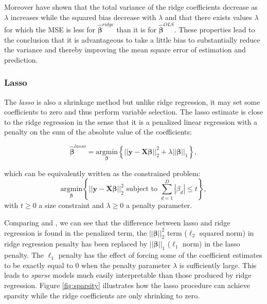 \documentclass[]{book}
\begin{document}
Moreover \citep{hoerl1970ridge} have shown that the total variance of the
ridge coefficients decrease as \(\lambda\) increases while the squared
bias decrease with \(\lambda\) and that there exists values \(\lambda\) for
which the MSE is less for \(\hat{\boldsymbol{\beta}}^{ridge}\) than it is for
\(\hat{\boldsymbol{\beta}}^{OLS}\). These properties lead to the conclusion that it is
advantageous to take a little bias to substantially reduce the variance
and thereby improving the mean square error of estimation and
prediction.

\hypertarget{lasso}{%
\subsubsection*{Lasso}\label{lasso}}

The \emph{lasso} \citep{tibshirani_regression_1996} is also a shrinkage method but
unlike ridge regression, it may set some coefficients to zero and thus
perform variable selection. The lasso estimate is close to the ridge
regression in the sense that it is a penalized linear regression with a
penalty on the sum of the absolute value of the coefficients:

\[\hat{\boldsymbol{\beta}}^{lasso} = \underset{\boldsymbol{\beta}}{\text{argmin}} \left\lbrace || \mathbf{y} - \mathbf{X}\boldsymbol{\beta} ||_2^2 + \lambda ||\boldsymbol{\beta}||_1 \right\rbrace, 
\label{eq:lasso}\]

which can be equivalently written as the constrained problem:
\[\underset{\boldsymbol{\beta}}{\text{argmin}} \left\lbrace || \mathbf{y} - \mathbf{X}\boldsymbol{\beta} ||_2^2 \text{ subject to } \sum_{d=1}^D |\beta_d| \leq t \right\rbrace,\]
with \(t \geqslant 0\) a size constraint and \(\lambda \geqslant 0\) a
penalty parameter.

Comparing and , we can see that the difference between lasso and ridge
regression is found in the penalized term, the \(||\boldsymbol{\beta}||_2^2\) term
(\(\ell_2\) squared norm) in ridge regression penalty has been replaced by
\(||\boldsymbol{\beta}||_1\) (\(\ell_1\) norm) in the lasso penalty. The \(\ell_1\)
penalty has the effect of forcing some of the coefficient estimates to
be exactly equal to 0 when the penalty parameter \(\lambda\) is
sufficiently large. This leads to \emph{sparse} models much easily
interpretable than those produced by ridge regression. Figure
\ref{fig:sparsity} illustrates how the lasso procedure can achieve
sparsity while the ridge coefficients are only shrinking to zero.
\end{document}
